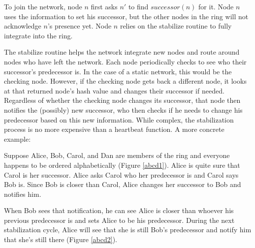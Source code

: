 \documentclass[10pt, conference, compsocconf]{IEEEtran}
\begin{document}
To join the network, node $n$ first asks $n'$ to find $successor(n)$ for it.  Node $n$ uses the information to set his successor, but the other nodes in the ring will not acknowledge $n$'s presence yet.  Node $n$ relies on the stabilize routine to fully integrate into the ring.

The stabilize routine helps the network integrate new nodes and route around nodes who have left the network. Each node periodically checks to see who their successor's predecessor is.  In the case of a static network, this would be the checking node.  However, if the checking node gets back a different node, it looks at that returned node's hash value and changes their successor if needed.  Regardless of whether the checking node changes its successor, that node then notifies the (possibly) new successor,  who then checks if he needs to change his predecessor based on this new information.  While complex, the stabilization process is no more expensive than a heartbeat function.  A more concrete example:


Suppose Alice, Bob, Carol, and Dan are members of the ring and everyone happens to be ordered alphabetically (Figure \ref{abcd1}). Alice is quite sure that Carol is her successor.  Alice asks Carol who her predecessor is and Carol says Bob is.  Since Bob is closer than Carol, Alice changes her successor to Bob and notifies him.  

When Bob sees that notification, he can see Alice is closer than whoever his previous predecessor is and sets Alice to be his predecessor.  During the next stabilization cycle, Alice will see that she is still Bob's predecessor and notify him that she's still there (Figure \ref{abcd2}).




\end{document}
